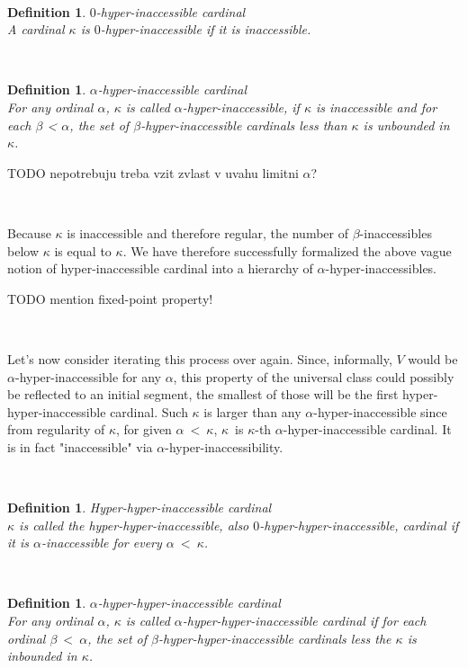 \documentclass[12pt,a4paper]{article}
\newtheorem{definition}[theorem]{Definition}
\begin{document}
\

\begin{definition}{$0$-hyper-inaccessible cardinal}\\
A cardinal $\kappa$ is $0$-hyper-inaccessible if it is inaccessible.
\end{definition}

\

\begin{definition}{$\alpha$-hyper-inaccessible cardinal}\label{def:alpha_hyper_inaccessible}\\
For any ordinal $\alpha$, $\kappa$ is called $\alpha$-hyper-inaccessible, if $\kappa$ is inaccessible and for each $\beta$ < $\alpha$, the set of $\beta$-hyper-inaccessible cardinals less than $\kappa$ is unbounded in $\kappa$.
\end{definition}

TODO nepotrebuju treba vzit zvlast v uvahu limitni $\alpha$?

\

Because $\kappa$ is inaccessible and therefore regular, the number of $\beta$-inaccessibles below $\kappa$ is equal to $\kappa$. We have therefore successfully formalized the above vague notion of hyper-inaccessible cardinal into a hierarchy of $\alpha$-hyper-inaccessibles.

TODO mention fixed-point property!

\

Let's now consider iterating this process over again. Since, informally, $V$ would be $\alpha$-hyper-inaccessible for any $\alpha$, this property of the universal class could possibly be reflected to an initial segment, the smallest of those will be the first hyper-hyper-inaccessible cardinal. Such $\kappa$ is larger than any $\alpha$-hyper-inaccessible since from regularity of $\kappa$, for given $\alpha\ <\ \kappa$, $\kappa$ is $\kappa$-th $\alpha$-hyper-inaccessible cardinal. It is in fact "inaccessible" via $\alpha$-hyper-inaccessibility.

\

\begin{definition}{Hyper-hyper-inaccessible cardinal}\\
$\kappa$ is called the hyper-hyper-inaccessible, also $0$-hyper-hyper-inaccessible, cardinal if it is $\alpha$-inaccessible for every $\alpha\ <\ \kappa$.
\end{definition}

\

\begin{definition}{$\alpha$-hyper-hyper-inaccessible cardinal}\\
For any ordinal $\alpha$, $\kappa$ is called $\alpha$-hyper-hyper-inaccessible cardinal if for each ordinal $\beta\ <\ \alpha$, the set of $\beta$-hyper-hyper-inaccessible cardinals less the $\kappa$ is inbounded in $\kappa$.
\end{definition}
\end{document}
